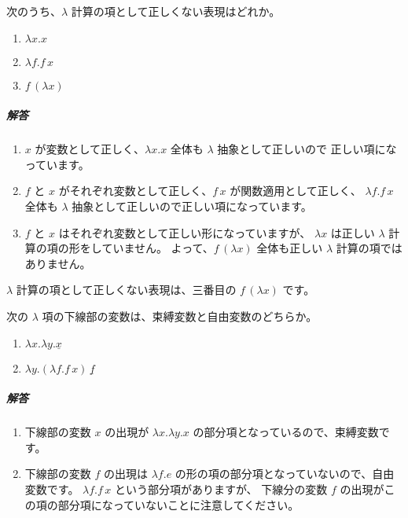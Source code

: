 \begin{exercise}

次のうち、$\lambda$ 計算の項として正しくない表現はどれか。

\begin{enumerate}
  \item $\lambda x . x$
  \item $\lambda f . f \, x$
  \item $f \, (\lambda x)$
\end{enumerate}

\subparagraph{解答}

\begin{enumerate}
  \item $x$ が変数として正しく、$\lambda x . x$ 全体も $\lambda$ 抽象として正しいので
        正しい項になっています。
  \item $f$ と $x$ がそれぞれ変数として正しく、$f \, x$ が関数適用として正しく、
        $\lambda f . f \, x$ 全体も $\lambda$ 抽象として正しいので正しい項になっています。
  \item $f$ と $x$ はそれぞれ変数として正しい形になっていますが、
        $\lambda x$ は正しい $\lambda$ 計算の項の形をしていません。
        よって、$f \, (\lambda x)$ 全体も正しい $\lambda$ 計算の項ではありません。
\end{enumerate}

$\lambda$ 計算の項として正しくない表現は、三番目の $f \, (\lambda x)$ です。

\end{exercise}

\begin{exercise}

次の $\lambda$ 項の下線部の変数は、束縛変数と自由変数のどちらか。

\begin{enumerate}
  \item $\lambda x . \lambda y . \underline{x}$
  \item $\lambda y . (\lambda f . f \, x) \, \underline{f}$
\end{enumerate}

\subparagraph{解答}

\begin{enumerate}
  \item 下線部の変数 $x$ の出現が $\lambda x . \lambda y . x$ の部分項となっているので、束縛変数です。
  \item 下線部の変数 $f$ の出現は $\lambda f . e$ の形の項の部分項となっていないので、自由変数です。
        $\lambda f . f \, x$ という部分項がありますが、
        下線分の変数 $f$ の出現がこの項の部分項になっていないことに注意してください。
\end{enumerate}

\end{exercise}

